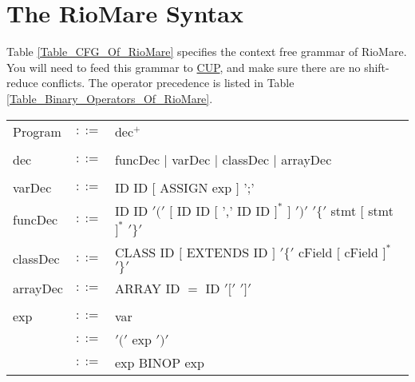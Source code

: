 \documentclass{article}
\begin{document}
\section{The RioMare Syntax}
Table \ref{Table_CFG_Of_RioMare} specifies the context free grammar of RioMare.
You will need to feed this grammar to \href{http://www2.cs.tum.edu/projects/cup/}{CUP},
and make sure there are no shift-reduce conflicts.
The operator precedence is listed in Table
\ref{Table_Binary_Operators_Of_RioMare}. 
\begin{table}[h]
\centering
\begin{tabular}{ l c l }
Program  & $::=$ & dec$^{+}$ \\
\\
dec      & $::=$ & funcDec $|$ varDec $|$ classDec $|$ arrayDec \\
\\
varDec   & $::=$ & ID ID $[$ ASSIGN exp $]$ ';' \\
funcDec  & $::=$ & ID ID $'('$ $[$ ID ID $[$ ',' ID ID $]^{*}$ $]$ $')'$ %
                   $'\{'$ stmt   $[$ stmt $]^{*}$ $'\}'$                 \\
classDec & $::=$ & CLASS ID $[$ EXTENDS ID $]$ $'\{'$ cField $[$ cField $]^{*}$ $'\}'$ \\
arrayDec & $::=$ & ARRAY ID $=$ ID $'['$ $']'$ \\
\\
exp      & $::=$ & var                                                            \\
         & $::=$ & $'('$ exp $')'$                                                \\
         & $::=$ & exp BINOP exp                                                  \\

\end{tabular}
\end{table}
\end{document}
